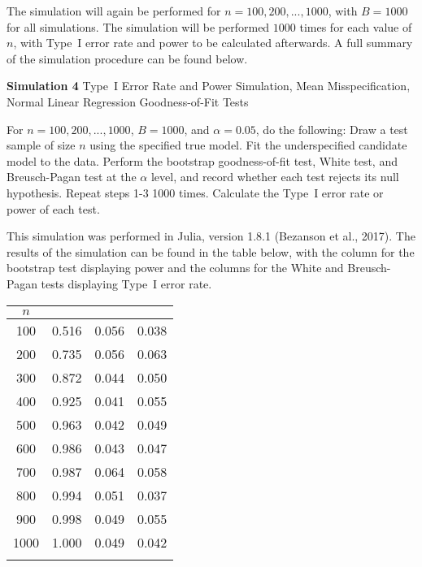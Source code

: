 		The simulation will again be performed for $n = 100,200,...,1000$, with $B = 1000$ for all simulations. The simulation will be performed $1000$ times for each value of $n$, with
		Type~I error rate and power to be calculated afterwards. A full summary of the simulation procedure can be found below.
		\begin{algorithm}[H]
			\caption*{\textbf{Simulation 4} Type~I Error Rate and Power Simulation, Mean Misspecification, Normal Linear Regression Goodness-of-Fit Tests}
			\begin{algorithmic}[1]
			  \Statex For $n = 100,200,...,1000$, $B = 1000$, and $\alpha = 0.05$, do the following:
			  \State Draw a test sample of size $n$ using the specified true model.
			  \State Fit the underspecified candidate model to the data.
			  \State Perform the bootstrap goodness-of-fit test, White test, and Breusch-Pagan test at the $\alpha$ level,
			  and record whether each test rejects its null hypothesis.
			  \State Repeat steps 1-3 1000 times.
			  \State Calculate the Type~I error rate or power of each test.
			\end{algorithmic}
		\end{algorithm}

		This simulation was performed in Julia, version 1.8.1 (Bezanson et al., 2017). The results of the simulation can be found in the table below, with the column for the
		bootstrap test displaying power and the columns for the White and Breusch-Pagan tests displaying Type~I error rate.

		\begin{table}[H]
			\centering
			\small\addtolength{\tabcolsep}{-3pt}
			\setlength\extrarowheight{-3pt}
			{
			\begin{tabular}{ c|c|c|c}
			$n$ & \vtop{\hbox{\strut Bootstrap}\hbox{\strut Test}} & \vtop{\hbox{\strut White}\hbox{\strut Test}} & \vtop{\hbox{\strut Breusch-Pagan} \hbox{\strut Test}} \\
			 \hline
			 100 & 0.516 & 0.056 & 0.038 \\
			 200 & 0.735 & 0.056 & 0.063 \\
			 300 & 0.872 & 0.044 & 0.050 \\
			 400 & 0.925 & 0.041 & 0.055 \\
			 500 & 0.963 & 0.042 & 0.049 \\
			 600 & 0.986 & 0.043 & 0.047 \\
			 700 & 0.987 & 0.064 & 0.058 \\
			 800 & 0.994 & 0.051 & 0.037 \\
			 900 & 0.998 & 0.049 & 0.055 \\
			 1000 & 1.000 & 0.049 & 0.042 \\
			 
			 \Xhline{3\arrayrulewidth}
			\end{tabular}
			}
		\end{table}

